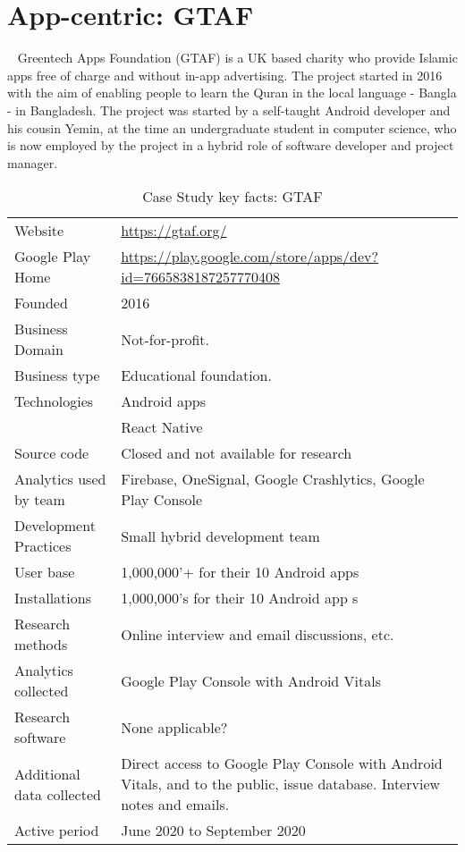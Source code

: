 \clearpage





\section{App-centric: GTAF}~\label{case-study-overview-gtaf}
Greentech Apps Foundation (GTAF) is a UK based charity who provide Islamic apps free of charge and without in-app advertising. The project started in 2016 with the aim of enabling people to learn the Quran in the local language - Bangla - in Bangladesh. The project was started by a self-taught Android developer and his cousin Yemin, at the time an undergraduate student in computer science, who is now employed by the project in a hybrid role of software developer and project manager. 

{\renewcommand{\arraystretch}{0.8}%
\begin{table}[htbp!]
    \centering
    \small
    \setlength{\tabcolsep}{1pt}
    \begin{tabular}{lp{9cm}}
       \toprule
       Website &\url{https://gtaf.org/} \\
       Google Play Home & \url{https://play.google.com/store/apps/dev?id=7665838187257770408} \\
       Founded & 2016 \\
       Business Domain & Not-for-profit.  \\
       Business type & Educational foundation. \\
       Technologies  & Android apps\footnotemark \\
       & React Native \\
       Source code  & Closed and not available for research \\
       Analytics used by team & Firebase, OneSignal, Google Crashlytics, Google Play Console \\
       Development Practices & Small hybrid development team \\
       \midrule
       User base & 1,000,000'+ for their 10 Android apps \\
       Installations & 1,000,000's for their 10 Android app s\\
       \midrule
       Research methods &Online interview and email discussions, etc. \\
       Analytics collected &Google Play Console with Android Vitals \\
       Research software & None applicable? \\
       Additional data collected &Direct access to Google Play Console with Android Vitals, and to the public, issue database. Interview notes and emails. \\
       Active period & June 2020 to September 2020 \\
       \bottomrule
    \end{tabular}
    \caption{Case Study key facts: GTAF}
    \label{tab:blank_case_study_anaytics_overview}
\end{table}
}

